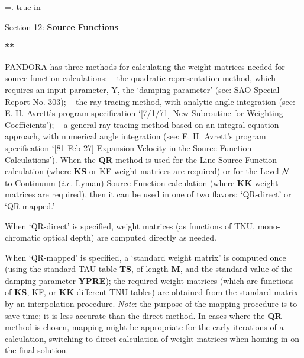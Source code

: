 %
\newtoks\footline \footline={\hss{}.\folio\hss}
\top
{} true in
\centerline{Section 12: {\bf Source Functions}}
\blankline
\blankline
\centerline{\bf ***}
\blankline
\blankline
PANDORA has three methods for calculating the weight matrices needed for
source function calculations:
\blankline
{} -- \np
the quadratic representation method, which requires an input parameter, Y,
the `damping parameter' (see: SAO Special Report No. 303);
\blankline
{} -- \np
the ray tracing method, with analytic angle integration (see: E. H. Avrett's
program specification `[7/1/71] New Subroutine for Weighting Coefficients');
\blankline
{} -- \np
a general ray tracing method based on an integral equation approach,
with numerical angle integration (see: E. H. Avrett's program specification
`[81 Feb 27] Expansion Velocity in the Source Function Calculations').
\ej
When the {\bf QR} method is used for the Line Source Function calculation
\break (where {\bf KS} or KF weight matrices are required) or for the 
Level-${\cal N}$-to-Continuum ({\it i.e.} Lyman) Source Function
calculation (where {\bf KK} weight matrices are required), then it can be
used in one of two flavors: `QR-direct' or `QR-mapped.'

When `QR-direct' is specified, weight matrices (as functions of TNU, 
mono-chromatic optical depth) are computed directly as needed. 

When `QR-mapped' is specified, a `standard weight matrix'
is computed once (using the standard TAU table {\bf TS},
of length {\bf M}, and the standard value of the damping parameter {\bf YPRE});
the required weight matrices 
(which are functions of {\bf KS}, KF, or {\bf KK}
different TNU tables) are obtained from the standard matrix by an interpolation
procedure. {\it Note}: the purpose of the mapping procedure is to save
time; it is less accurate than the direct method.
In cases where the {\bf QR} method is chosen, 
mapping might be appropriate for the early iterations
of a calculation, switching to direct calculation of weight matrices 
when homing in on the final solution.

